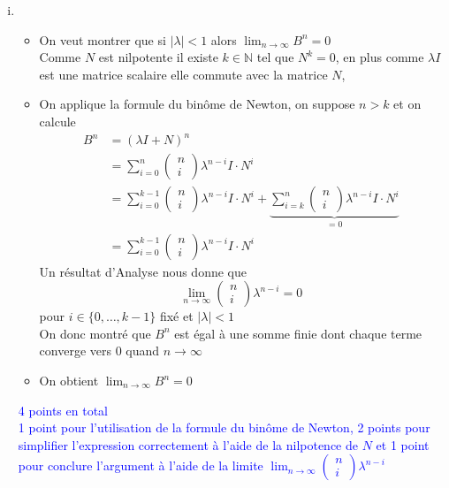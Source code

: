 \documentclass[11pt, a4paper, oneside]{article}
\newcommand{\indice}[1]{{\scriptsize \color{RubineRed} {#1}}}
\begin{document}
\begin{enumerate}[i)]
\item 
\begin{itemize}
\item On veut montrer que si $|\lambda|<1$ alors $\lim_{n\rightarrow \infty}B^n = 0$ \\
\indice{Comme $N$ est nilpotente il existe $k \in \mathbb{N}$ tel que $N^k = 0$, en plus comme $\lambda I$ est une matrice scalaire elle commute avec la matrice $N$,} 
\item On applique la formule du binôme de Newton, on suppose $n>k$ et on calcule
\begin{align*}
    B^n &= (\lambda I + N)^n \\
    &= \sum_{i=0}^n \begin{pmatrix} n \\ i \end{pmatrix} \lambda^{n-i}I \cdot N^i \\
    &= \sum_{i=0}^{k-1} \begin{pmatrix} n \\ i \end{pmatrix} \lambda^{n-i}I \cdot N^i + \underbrace{\sum_{i=k}^n \begin{pmatrix} n \\ i \end{pmatrix} \lambda^{n-i}I \cdot N^i}_{=0} \\
    &= \sum_{i=0}^{k-1} \begin{pmatrix} n \\ i \end{pmatrix} \lambda^{n-i}I \cdot N^i
\end{align*}
\indice{Un résultat d'Analyse nous donne que} $$\lim_{n \rightarrow \infty} \begin{pmatrix} n \\ i \end{pmatrix} \lambda^{n-i} = 0$$ pour $i \in \{0,\ldots,k-1\}$ fixé et $|\lambda|<1$ \\
\indice{On donc montré que $B^n$ est égal à une somme finie dont chaque terme converge vers 0 quand $n \rightarrow \infty$} 
\item On obtient $\lim_{n\rightarrow \infty}B^n = 0$ \\
\end{itemize}
\textcolor{blue}{4 points en total \\ 1 point pour l'utilisation de la formule du binôme de Newton, 2 points pour simplifier l'expression correctement à l'aide de la nilpotence de $N$ et 1 point pour conclure l'argument à l'aide de la limite $\lim_{n \rightarrow \infty} \begin{pmatrix} n \\ i \end{pmatrix} \lambda^{n-i}$} 


\end{enumerate}
\end{document}
